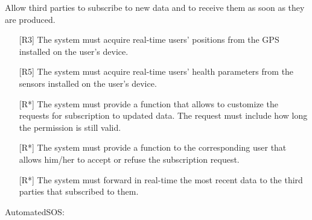 \begin{enumerate} [label={[G\arabic*]}]
    \item Allow third parties to subscribe to new data and to receive them as soon as they are produced.
        \begin{itemize}
            \item [{[R3]}] The system must acquire real-time users' positions from the GPS installed on the user's device.
            \item [{[R5]}] The system must acquire real-time users' health parameters from the sensors installed on the user's device.
            \item [{[R*]}] The system must provide a function that allows to customize the requests for subscription to updated data. The request must include how long the permission is still valid.
            \item [{[R*]}] The system must provide a function to the corresponding user that allows him/her to accept or refuse the subscription request.
            \item [{[R*]}] The system must forward in real-time the most recent data to the third parties that subscribed to them.
        \end{itemize}
\end{enumerate}  
\noindent
AutomatedSOS:
